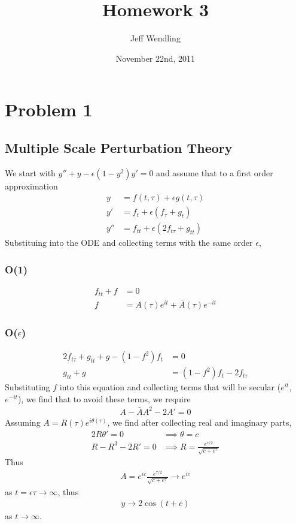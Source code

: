 \documentclass[12pt]{article}
\title{Homework 3}
\author{Jeff Wendling}
\date{November 22nd, 2011}
\newcommand{\eq}[1]{\begin{align*}#1\end{align*}}
\begin{document}
\maketitle
\section*{Problem 1}
\subsection*{Multiple Scale Perturbation Theory} We start with $y'' + y - \epsilon(1 - y^2)y' = 0$ and assume that to a first order approximation
\eq{
	y &= f(t,\tau) + \epsilon g(t,\tau)\\
	y' &= f_t + \epsilon(f_\tau + g_t)\\
	y'' &= f_{tt} + \epsilon(2f_{t\tau} + g_{tt})
}
Substituing into the ODE and collecting terms with the same order $\epsilon$,
\subsubsection*{O(1)}
\eq{
	f_{tt} + f &= 0\\
	f &= A(\tau)e^{it} + \bar{A}(\tau)e^{-it}
}
\subsubsection*{O($\epsilon$)}
\eq{
	2f_{t\tau} + g_{tt} + g - (1-f^2)f_t &= 0\\
	g_{tt} + g &= (1-f^2)f_t - 2f_{t\tau}
}
Substituting $f$ into this equation and collecting terms that will be secular ($e^{it}$, $e^{-it}$), we find that to avoid these terms, we require
\eq{
	A - \bar{A}A^2 - 2A' = 0
}
Assuming $A = R(\tau)e^{i\theta(\tau)}$, we find after collecting real and imaginary parts,
\eq{
	2R\theta' = 0 &\implies \theta = c\\
	R - R^3 - 2R' = 0 &\implies R = \frac{e^{\tau/2}}{\sqrt{c + e^\tau}}
}
Thus
\eq{
	A = e^{ic}\frac{e^{\tau / 2}}{\sqrt{c + e^\tau}} \rightarrow e^{ic}
}
as $t = \epsilon\tau \rightarrow \infty$, thus
\eq{
	y \rightarrow 2\cos(t+c)
}
as $t \rightarrow \infty$.
\end{document}
